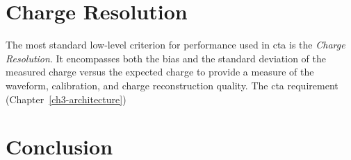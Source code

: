 

\section{Charge Resolution}

The most standard low-level criterion for performance used in \gls{cta} is the \textit{Charge Resolution}. It encompasses both the bias and the standard deviation of the measured charge versus the expected charge to provide a measure of the waveform, calibration, and charge reconstruction quality. The \gls{cta} requirement  (Chapter~\ref{ch3-architecture})  



\section{Conclusion}